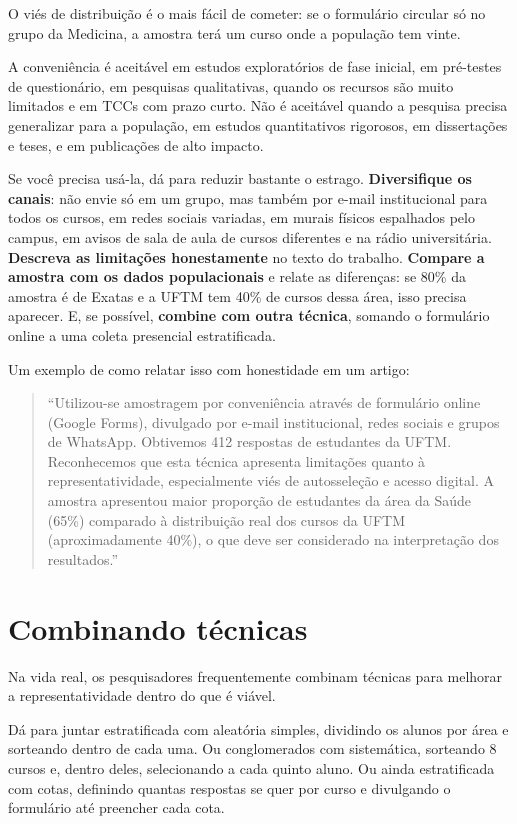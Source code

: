 \documentclass[
]{book}
\begin{document}
O viés de distribuição é o mais fácil de cometer: se o formulário circular só no grupo da Medicina, a amostra terá um curso onde a população tem vinte.

A conveniência é aceitável em estudos exploratórios de fase inicial, em pré-testes de questionário, em pesquisas qualitativas, quando os recursos são muito limitados e em TCCs com prazo curto. Não é aceitável quando a pesquisa precisa generalizar para a população, em estudos quantitativos rigorosos, em dissertações e teses, e em publicações de alto impacto.

Se você precisa usá-la, dá para reduzir bastante o estrago. \textbf{Diversifique os canais}: não envie só em um grupo, mas também por e-mail institucional para todos os cursos, em redes sociais variadas, em murais físicos espalhados pelo campus, em avisos de sala de aula de cursos diferentes e na rádio universitária. \textbf{Descreva as limitações honestamente} no texto do trabalho. \textbf{Compare a amostra com os dados populacionais} e relate as diferenças: se 80\% da amostra é de Exatas e a UFTM tem 40\% de cursos dessa área, isso precisa aparecer. E, se possível, \textbf{combine com outra técnica}, somando o formulário online a uma coleta presencial estratificada.

Um exemplo de como relatar isso com honestidade em um artigo:

\begin{quote}
``Utilizou-se amostragem por conveniência através de formulário online (Google Forms), divulgado por e-mail institucional, redes sociais e grupos de WhatsApp. Obtivemos 412 respostas de estudantes da UFTM. Reconhecemos que esta técnica apresenta limitações quanto à representatividade, especialmente viés de autosseleção e acesso digital. A amostra apresentou maior proporção de estudantes da área da Saúde (65\%) comparado à distribuição real dos cursos da UFTM (aproximadamente 40\%), o que deve ser considerado na interpretação dos resultados.''
\end{quote}

\section{Combinando técnicas}\label{combinando-tuxe9cnicas}

Na vida real, os pesquisadores frequentemente combinam técnicas para melhorar a representatividade dentro do que é viável.

Dá para juntar estratificada com aleatória simples, dividindo os alunos por área e sorteando dentro de cada uma. Ou conglomerados com sistemática, sorteando 8 cursos e, dentro deles, selecionando a cada quinto aluno. Ou ainda estratificada com cotas, definindo quantas respostas se quer por curso e divulgando o formulário até preencher cada cota.
\end{document}
